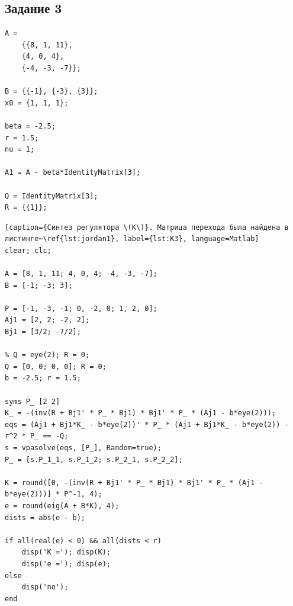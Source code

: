\documentclass[a4paper,12pt]{article}
\begin{document}
\newpage \subsection*{Задание 3}

\begin{lstlisting}[caption={Инициализация}]
A =   
	{{8, 1, 11},
	{4, 0, 4}, 
	{-4, -3, -7}};

B = {{-1}, {-3}, {3}};
x0 = {1, 1, 1};

beta = -2.5;
r = 1.5;
nu = 1;

A1 = A - beta*IdentityMatrix[3];

Q = IdentityMatrix[3];
R = {{1}};
\end{lstlisting}


\begin{lstlisting}[caption={Синтез регулятора \(K\)}. Матрица перехода была найдена в листинге~\ref{lst:jordan1}, label={lst:K3}, language=Matlab]
clear; clc;

A = [8, 1, 11; 4, 0, 4; -4, -3, -7];
B = [-1; -3; 3];

P = [-1, -3, -1; 0, -2, 0; 1, 2, 0];
Aj1 = [2, 2; -2, 2];
Bj1 = [3/2; -7/2];

% Q = eye(2); R = 0;
Q = [0, 0; 0, 0]; R = 0;
b = -2.5; r = 1.5;

syms P_ [2 2]
K_ = -(inv(R + Bj1' * P_ * Bj1) * Bj1' * P_ * (Aj1 - b*eye(2)));
eqs = (Aj1 + Bj1*K_ - b*eye(2))' * P_ * (Aj1 + Bj1*K_ - b*eye(2)) - r^2 * P_ == -Q;
s = vpasolve(eqs, [P_], Random=true);
P_ = [s.P_1_1, s.P_1_2; s.P_2_1, s.P_2_2];

K = round([0, -(inv(R + Bj1' * P_ * Bj1) * Bj1' * P_ * (Aj1 - b*eye(2)))] * P^-1, 4);
e = round(eig(A + B*K), 4);
dists = abs(e - b);

if all(real(e) < 0) && all(dists < r)
	disp('K ='); disp(K);
	disp('e ='); disp(e);
else
	disp('no');
end
\end{lstlisting}
	
\end{document}
